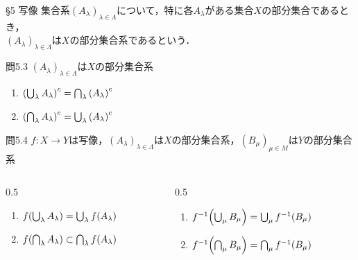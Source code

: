 \documentclass[uplatex,a4paper,dvipdfmx,aspectratio=169,11pt]{beamer}
\begin{document}
\begin{frame}[fragile]{\S 5 写像}
    集合系$(A_\lambda)_{\lambda \in \Lambda}$について，特に各$A_\lambda$がある集合$X$の部分集合であるとき，\\
    $(A_\lambda)_{\lambda \in \Lambda}$は$X$の\alert{部分集合系}であるという．
    \medskip

    \begin{exampleblock}{問5.3}
        $(A_\lambda)_{\lambda \in \Lambda}$は$X$の部分集合系
        \begin{enumerate}[(1)]
            \item $\qty(\bigcup_\lambda A_\lambda)^c = \bigcap_\lambda \qty(A_\lambda)^c$
            \item $\qty(\bigcap_\lambda A_\lambda)^c = \bigcup_\lambda \qty(A_\lambda)^c$
        \end{enumerate}
    \end{exampleblock}

    \begin{exampleblock}{問5.4}
        $f \colon X \to Y$は写像，$(A_\lambda)_{\lambda \in \Lambda}$は$X$の部分集合系，$(B_\mu)_{\mu \in M}$は$Y$の部分集合系
        \begin{columns}
            \begin{column}{0.5\linewidth}
                \begin{enumerate}[(1)]
                    \item $f\qty(\bigcup_\lambda A_\lambda) = \bigcup_\lambda f\qty(A_\lambda)$
                    \item $f\qty(\bigcap_\lambda A_\lambda) \subset \bigcap_\lambda f\qty(A_\lambda)$
                \end{enumerate}
            \end{column}
            \begin{column}{0.5\linewidth}
                \begin{enumerate}
                    \item[(3)] $f^{-1}\qty(\bigcup_\mu B_\mu) = \bigcup_\mu f^{-1}\qty(B_\mu)$
                    \item[(4)] $f^{-1}\qty(\bigcap_\mu B_\mu) = \bigcap_\mu f^{-1}\qty(B_\mu)$
                \end{enumerate}
            \end{column}
        \end{columns}
    \end{exampleblock}
\end{frame}
\end{document}
